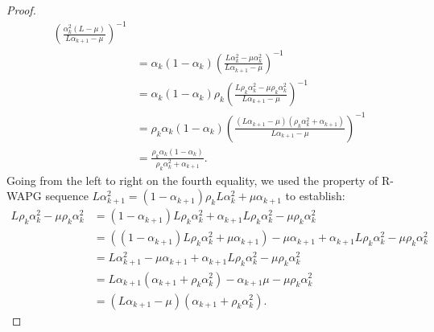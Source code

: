 \documentclass[12pt]{article}
\begin{document}
\begin{proof}
\begin{align*}
                \left(
                    \frac{\alpha_k^2(L - \mu)}{L\alpha_{k + 1} - \mu}
                \right)^{-1}
                \\
                &= \alpha_k(1 - \alpha_k)
                \left(
                    \frac{L\alpha_k^2 - \mu\alpha_k^2}{L\alpha_{k + 1} - \mu}
                \right)^{-1}
                \\
                &=
                \alpha_k(1 - \alpha_k)
                \rho_k\left(
                    \frac{L\rho_k\alpha_k^2 - \mu\rho_k\alpha_k^2}{L\alpha_{k + 1} - \mu}
                \right)^{-1}
                \\
                &=
                \rho_k\alpha_k(1 - \alpha_k)
                \left(
                    \frac{(L\alpha_{k + 1} - \mu)(\rho_k\alpha_k^2 + \alpha_{k + 1})}
                    {L\alpha_{k + 1} - \mu}
                \right)^{-1}
                \\
                &= \frac{\rho_k\alpha_k(1 - \alpha_k)}{\rho_k\alpha_k^2 + \alpha_{k + 1}}.
            \end{align*}
            Going from the left to right on the fourth equality, we used the property of R-WAPG sequence $L\alpha_{k + 1}^2 = (1 - \alpha_{k + 1})\rho_kL\alpha_k^2 + \mu \alpha_{k + 1}$ to establish:
            \begin{align*}
                L \rho_k \alpha_k^2 - \mu \rho_k \alpha_k^2
                &=
                (1 - \alpha_{k + 1})L \rho_k \alpha_k^2 + \alpha_{k + 1} L \rho_k \alpha_k^2 - \mu \rho_k \alpha_k^2
                \\
                &=
                ((1 - \alpha_{k + 1})L \rho_k \alpha_k^2 + \mu \alpha_{k + 1}) - \mu\alpha_{k + 1} + \alpha_{k + 1} L \rho_k \alpha_k^2 - \mu \rho_k \alpha_k^2
                \\
                &= L \alpha_{k + 1}^2 - \mu\alpha_{k + 1} + \alpha_{k + 1}L\rho_k\alpha_k^2 - \mu \rho_k \alpha_k^2
                \\
                &=
                L\alpha_{k + 1}(\alpha_{k + 1} + \rho_k \alpha_k^2) - \alpha_{k + 1}\mu - \mu \rho_k \alpha_k^2
                \\
                &= (L \alpha_{k + 1} - \mu)(\alpha_{k + 1} + \rho_k \alpha_k^2).
            \end{align*}

\end{proof}
\end{document}
